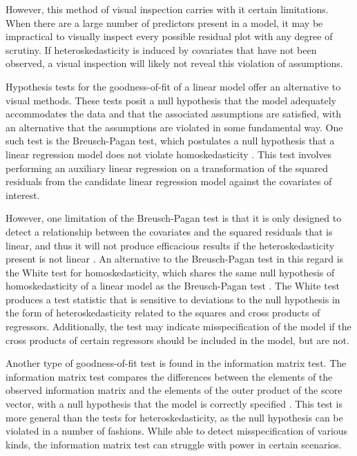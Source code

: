 \documentclass[sn-mathphys-ay]{sn-jnl}
\begin{document}
		However, this method of visual inspection carries with it certain limitations. When there are a large number of predictors present in a model, it may be impractical to visually inspect every
		possible residual plot with any degree of scrutiny. If heteroskedasticity is induced by covariates that have not been observed, a visual inspection will likely
		not reveal this violation of assumptions.

		Hypothesis tests for the goodness-of-fit of a linear model offer an alternative to visual methods. These tests posit a null hypothesis that the model adequately accommodates the data and that
		the associated assumptions are satisfied, with an alternative that the assumptions are violated in some fundamental way. One such test is the Breusch-Pagan test, which postulates a null hypothesis
		that a linear regression model does not violate homoskedasticity \citep{Breusch}. This test involves performing an auxiliary linear regression on a transformation of the squared residuals from
		the candidate linear regression model against the covariates of interest.

		However, one limitation of the Breusch-Pagan test is that it is only designed to detect a relationship between the covariates and the squared residuals that is linear, and thus it will not
		produce efficacious results if the heteroskedasticity present is not linear \citep{Waldman}. An alternative to the Breusch-Pagan test in this regard is the White test for homoskedasticity,
		which shares the same null hypothesis of homoskedasticity of a linear model as the Breusch-Pagan test \citep{White1980}. The White test produces a test statistic that is sensitive to deviations to
		the null hypothesis in the form of heteroskedasticity related to the squares and cross products of regressors. Additionally, the test may indicate misspecification of the model if the cross products
		of certain regressors should be included in the model, but are not.

		Another type of goodness-of-fit test is found in the information matrix test. The information matrix test compares the differences between the elements of the observed information matrix and the elements
		of the outer product of the score vector, with a null hypothesis that the model is correctly specified \citep{White1982}. This test is more general than the tests for heteroskedasticity, as the null
		hypothesis can be violated in a number of fashions. While able to
		detect misspecification of various kinds, the information matrix test can struggle with power in certain scenarios.
  
\end{document}
